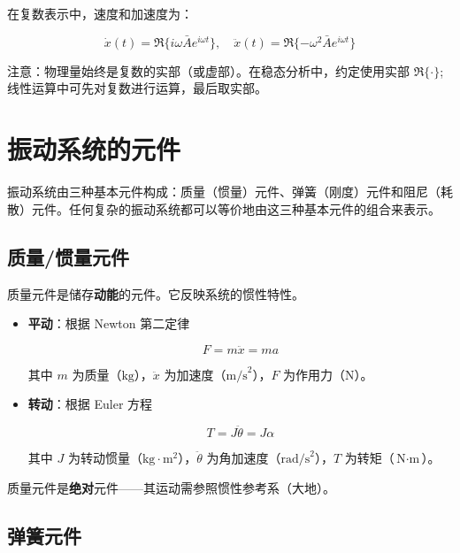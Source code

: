 在复数表示中，速度和加速度为：
\begin{myformula}
    \[
    \dot{x}(t) = \Re\{i\omega \bar{A} e^{i\omega t}\},\quad
    \ddot{x}(t) = \Re\{-\omega^2 \bar{A} e^{i\omega t}\}
    \]
\end{myformula}

注意：物理量始终是复数的实部（或虚部）。在稳态分析中，约定使用实部 $\Re\{\cdot\}$;线性运算中可先对复数进行运算，最后取实部。

\section{振动系统的元件}

振动系统由三种基本元件构成：质量（惯量）元件、弹簧（刚度）元件和阻尼（耗散）元件。任何复杂的振动系统都可以等价地由这三种基本元件的组合来表示。

\subsection{质量/惯量元件}

质量元件是储存\textbf{动能}的元件。它反映系统的惯性特性。

\begin{itemize}
    \item \textbf{平动}：根据 Newton 第二定律
    \begin{myformula}
        \[
        F = m\ddot{x} = m a
        \]
    \end{myformula}
    其中 $m$ 为质量（$\text{kg}$），$\ddot{x}$ 为加速度（$\text{m/s}^2$），$F$ 为作用力（$\text{N}$）。
    
    \item \textbf{转动}：根据 Euler 方程
    \begin{myformula}
        \[
        T = J\ddot{\theta} = J\alpha
        \]
    \end{myformula}
    其中 $J$ 为转动惯量（$\text{kg}\cdot\text{m}^2$），$\ddot{\theta}$ 为角加速度（$\text{rad/s}^2$），$T$ 为转矩（$\text{N}\cdot\text{m}$）。
\end{itemize}

质量元件是\textbf{绝对}元件——其运动需参照惯性参考系（大地）。

\subsection{弹簧元件}

